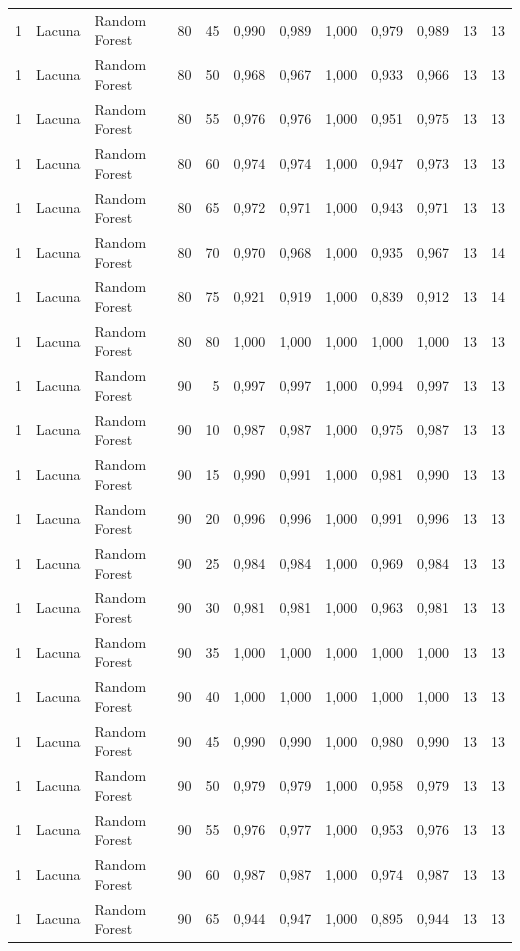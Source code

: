 \begin{longtable}{@{}rllrrrrrrrrr@{}}
1 & Lacuna & Random Forest & 80 & 45 & 0,990 & 0,989 & 1,000 & 0,979 & 0,989 & 13 & 13 \\
1 & Lacuna & Random Forest & 80 & 50 & 0,968 & 0,967 & 1,000 & 0,933 & 0,966 & 13 & 13 \\
1 & Lacuna & Random Forest & 80 & 55 & 0,976 & 0,976 & 1,000 & 0,951 & 0,975 & 13 & 13 \\
1 & Lacuna & Random Forest & 80 & 60 & 0,974 & 0,974 & 1,000 & 0,947 & 0,973 & 13 & 13 \\
1 & Lacuna & Random Forest & 80 & 65 & 0,972 & 0,971 & 1,000 & 0,943 & 0,971 & 13 & 13 \\
1 & Lacuna & Random Forest & 80 & 70 & 0,970 & 0,968 & 1,000 & 0,935 & 0,967 & 13 & 14 \\
1 & Lacuna & Random Forest & 80 & 75 & 0,921 & 0,919 & 1,000 & 0,839 & 0,912 & 13 & 14 \\
1 & Lacuna & Random Forest & 80 & 80 & 1,000 & 1,000 & 1,000 & 1,000 & 1,000 & 13 & 13 \\
1 & Lacuna & Random Forest & 90 & 5 & 0,997 & 0,997 & 1,000 & 0,994 & 0,997 & 13 & 13 \\
1 & Lacuna & Random Forest & 90 & 10 & 0,987 & 0,987 & 1,000 & 0,975 & 0,987 & 13 & 13 \\
1 & Lacuna & Random Forest & 90 & 15 & 0,990 & 0,991 & 1,000 & 0,981 & 0,990 & 13 & 13 \\
1 & Lacuna & Random Forest & 90 & 20 & 0,996 & 0,996 & 1,000 & 0,991 & 0,996 & 13 & 13 \\
1 & Lacuna & Random Forest & 90 & 25 & 0,984 & 0,984 & 1,000 & 0,969 & 0,984 & 13 & 13 \\
1 & Lacuna & Random Forest & 90 & 30 & 0,981 & 0,981 & 1,000 & 0,963 & 0,981 & 13 & 13 \\
1 & Lacuna & Random Forest & 90 & 35 & 1,000 & 1,000 & 1,000 & 1,000 & 1,000 & 13 & 13 \\
1 & Lacuna & Random Forest & 90 & 40 & 1,000 & 1,000 & 1,000 & 1,000 & 1,000 & 13 & 13 \\
1 & Lacuna & Random Forest & 90 & 45 & 0,990 & 0,990 & 1,000 & 0,980 & 0,990 & 13 & 13 \\
1 & Lacuna & Random Forest & 90 & 50 & 0,979 & 0,979 & 1,000 & 0,958 & 0,979 & 13 & 13 \\
1 & Lacuna & Random Forest & 90 & 55 & 0,976 & 0,977 & 1,000 & 0,953 & 0,976 & 13 & 13 \\
1 & Lacuna & Random Forest & 90 & 60 & 0,987 & 0,987 & 1,000 & 0,974 & 0,987 & 13 & 13 \\
1 & Lacuna & Random Forest & 90 & 65 & 0,944 & 0,947 & 1,000 & 0,895 & 0,944 & 13 & 13 \\

\end{longtable}
